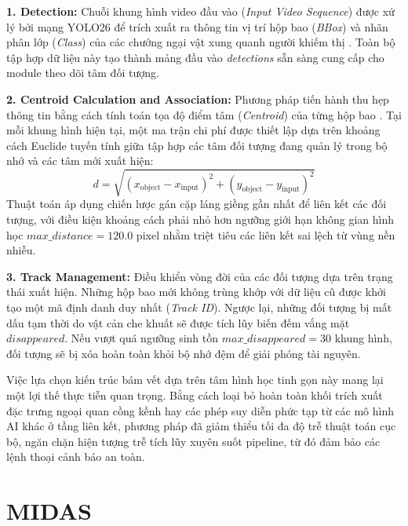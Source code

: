 \textbf{1. Detection:} Chuỗi khung hình video đầu vào (\textit{Input Video Sequence}) được xử lý bởi mạng YOLO26 để trích xuất ra thông tin vị trí hộp bao (\textit{BBox}) và nhãn phân lớp (\textit{Class}) của các chướng ngại vật xung quanh người khiếm thị \cite{Reference3}. Toàn bộ tập hợp dữ liệu này tạo thành mảng đầu vào \textit{detections} sẵn sàng cung cấp cho module theo dõi tâm đối tượng.

\textbf{2. Centroid Calculation and Association:} Phương pháp tiến hành thu hẹp thông tin bằng cách tính toán tọa độ điểm tâm (\textit{Centroid}) của từng hộp bao \cite{Reference16}. Tại mỗi khung hình hiện tại, một ma trận chi phí được thiết lập dựa trên khoảng cách Euclide tuyến tính giữa tập hợp các tâm đối tượng đang quản lý trong bộ nhớ và các tâm mới xuất hiện:
\begin{equation}
d = \sqrt{(x_{\text{object}} - x_{\text{input}})^2 + (y_{\text{object}} - y_{\text{input}})^2}
\end{equation}
Thuật toán áp dụng chiến lược gán cặp láng giềng gần nhất để liên kết các đối tượng, với điều kiện khoảng cách phải nhỏ hơn ngưỡng giới hạn không gian hình học $max\_distance = 120.0$ pixel nhằm triệt tiêu các liên kết sai lệch từ vùng nền nhiễu.

\textbf{3. Track Management:} Điều khiển vòng đời của các đối tượng dựa trên trạng thái xuất hiện. Những hộp bao mới không trùng khớp với dữ liệu cũ được khởi tạo một mã định danh duy nhất (\textit{Track ID}). Ngược lại, những đối tượng bị mất dấu tạm thời do vật cản che khuất sẽ được tích lũy biến đếm vắng mặt $disappeared$. Nếu vượt quá ngưỡng sinh tồn $max\_disappeared = 30$ khung hình, đối tượng sẽ bị xóa hoàn toàn khỏi bộ nhớ đệm để giải phóng tài nguyên.

Việc lựa chọn kiến trúc bám vết dựa trên tâm hình học tinh gọn này mang lại một lợi thế thực tiễn quan trọng. Bằng cách loại bỏ hoàn toàn khối trích xuất đặc trưng ngoại quan cồng kềnh hay các phép suy diễn phức tạp từ các mô hình AI khác ở tầng liên kết, phương pháp đã giảm thiểu tối đa độ trễ thuật toán cục bộ, ngăn chặn hiện tượng trễ tích lũy xuyên suốt pipeline, từ đó đảm bảo các lệnh thoại cảnh báo an toàn.

\section{MIDAS}

